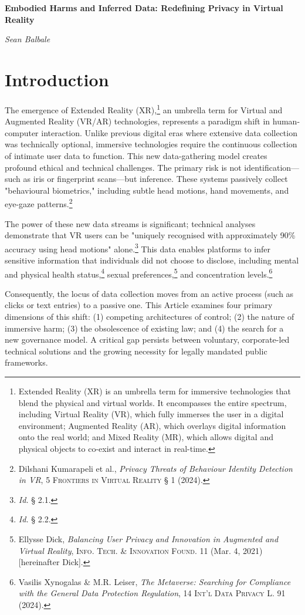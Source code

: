 \documentclass[12pt, letterpaper]{article}
\begin{document}
\begin{center}
    \textbf{\Large Embodied Harms and Inferred Data: Redefining Privacy in Virtual Reality}
    
    \vspace{1em}
    \textit{Sean Balbale}
\end{center}

\vspace{1em}

\section{Introduction}

The emergence of Extended Reality (XR),\footnote{Extended Reality (XR) is an umbrella term for immersive technologies that blend the physical and virtual worlds. It encompasses the entire spectrum, including Virtual Reality (VR), which fully immerses the user in a digital environment; Augmented Reality (AR), which overlays digital information onto the real world; and Mixed Reality (MR), which allows digital and physical objects to co-exist and interact in real-time.} an umbrella term for Virtual and Augmented Reality (VR/AR) technologies, represents a paradigm shift in human-computer interaction. Unlike previous digital eras where extensive data collection was technically optional, immersive technologies require the continuous collection of intimate user data to function. This new data-gathering model creates profound ethical and technical challenges. The primary risk is not identification—such as iris or fingerprint scans—but inference. These systems passively collect "behavioural biometrics," including subtle head motions, hand movements, and eye-gaze patterns.\footnote{Dilshani Kumarapeli et al., \textit{Privacy Threats of Behaviour Identity Detection in VR}, 5 \textsc{Frontiers in Virtual Reality} § 1 (2024).}

The power of these new data streams is significant; technical analyses demonstrate that VR users can be "uniquely recognised with approximately 90\% accuracy using head motions" alone.\footnote{\textit{Id.} § 2.1.} This data enables platforms to infer sensitive information that individuals did not choose to disclose, including mental and physical health status,\footnote{\textit{Id.} § 2.2.} sexual preferences,\footnote{Ellysse Dick, \textit{Balancing User Privacy and Innovation in Augmented and Virtual Reality}, \textsc{Info. Tech. \& Innovation Found.} 11 (Mar. 4, 2021) [hereinafter Dick].} and concentration levels.\footnote{Vasilis Xynogalas \& M.R. Leiser, \textit{The Metaverse: Searching for Compliance with the General Data Protection Regulation}, 14 \textsc{Int'l Data Privacy L.} 91 (2024).}

Consequently, the locus of data collection moves from an active process (such as clicks or text entries) to a passive one. This Article examines four primary dimensions of this shift: (1) competing architectures of control; (2) the nature of immersive harm; (3) the obsolescence of existing law; and (4) the search for a new governance model. A critical gap persists between voluntary, corporate-led technical solutions and the growing necessity for legally mandated public frameworks.
\end{document}
